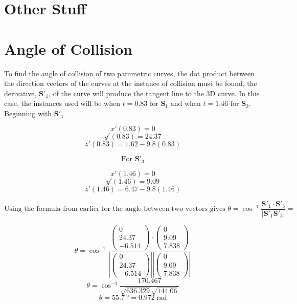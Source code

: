\documentclass{article}
\begin{document}
													\section*{Other Stuff}
													\section*{Angle of Collision}

													To find the angle of collision of two parametric curves, the dot product between the direction vectors of the curves at the instance of collision must be found, the derivative, \(\mathbf{S}'_{1}\), of the curve will produce the tangent line to the 3D curve. In this case, the instances used will be when \(t = 0.83 \text{ for } \mathbf{S}_{1} \text{ and when } t = 1.46 \text{ for } \mathbf{S}_{3}\). Beginning with \(\mathbf{S}'_{1}\) 

													\[x'(0.83) = 0\]
													\[y'(0.83) = 24.37\]
													\[z'(0.83) = 1.62 - 9.8(0.83)\]

													\[\text{For }\mathbf{S}'_{3}\]

													\[x'(1.46) = 0\]
													\[y'(1.46) = 9.09\]
													\[z'(1.46) = 6.47 - 9.8(1.46)\]

													\[\text{Using the formula from earlier for the angle between two vectors gives }\theta = \cos^{-1}\frac{\mathbf{S}'_{1}\cdot\mathbf{S}'_{3}}{|\mathbf{S}'_{1}\mathbf{S}'_{3}|} = \]


													\[\theta = \cos^{-1} \frac{\begin{pmatrix} 0 \\ 24.37 \\ -6.514 \end{pmatrix} \cdot \begin{pmatrix} 0 \\ 9.09 \\ 7.838 \end{pmatrix}}{ \left| \begin{pmatrix} 0 \\ 24.37 \\ -6.514 \end{pmatrix} \right| \left| \begin{pmatrix} 0 \\ 9.09 \\ 7.838 \end{pmatrix} \right| }\]
													\[\theta = \cos^{-1} \frac{170.467}{\sqrt{636.329}\sqrt{144.06}}\]
													\[\theta = \SI{55.7}{\degree} = \SI{0.972}{\radian}\]
\end{document}
